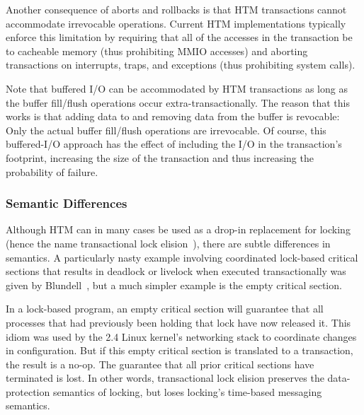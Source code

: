 Another consequence of aborts and rollbacks is that HTM transactions
cannot accommodate irrevocable operations.
Current HTM implementations typically enforce this limitation by
requiring that all of the accesses in the transaction be to cacheable
memory (thus prohibiting MMIO accesses) and aborting transactions on
interrupts, traps, and exceptions (thus prohibiting system calls).

Note that buffered I/O can be accommodated by HTM transactions as
long as the buffer fill/flush operations occur extra-transactionally.
The reason that this works is that adding data to and removing data
from the buffer is revocable: Only the actual buffer fill/flush
operations are irrevocable.
Of course, this buffered-I/O approach has the effect of including the I/O
in the transaction's footprint, increasing the size of the transaction
and thus increasing the probability of failure.

\subsubsection{Semantic Differences}
\label{sec:future:Semantic Differences}

Although HTM can in many cases be used as a drop-in replacement for locking
(hence the name transactional lock
elision~\cite{DaveDice2008TransactLockElision}),
there are subtle differences in semantics.
A particularly nasty example involving coordinated lock-based critical
sections that results in deadlock or livelock when executed transactionally
was given by Blundell~\cite{Blundell2006TMdeadlock}, but a much simpler
example is the empty critical section.

In a lock-based program, an empty critical section will guarantee
that all processes that had previously been holding that lock have
now released it.
This idiom was used by the 2.4 Linux kernel's networking stack to
coordinate changes in configuration.
But if this empty critical section is translated to a transaction,
the result is a no-op.
The guarantee that all prior critical sections have terminated is
lost.
In other words, transactional lock elision preserves the data-protection
semantics of locking, but loses locking's time-based messaging semantics.

